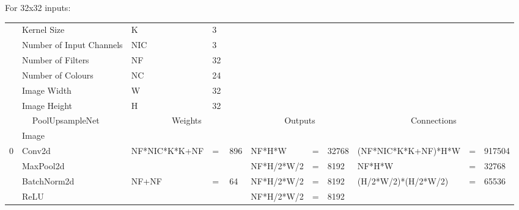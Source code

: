\documentclass{article}
\begin{document}

For 32x32 inputs:

\begin{tiny}
\setlength\tabcolsep{1.5pt}
\begin{tabular}{@{}lllllllllll@{}}
\toprule
      & Kernel Size                 & K                    & 3  &       &                &   &        &                                &   &          \\ 
      & Number of Input Channels    & NIC                  & 3  &       &                &   &        &                                &   &          \\
      & Number of Filters           & NF                   & 32 &       &                &   &        &                                &   &          \\
      & Number of Colours           & NC                   & 24 &       &                &   &        &                                &   &          \\
      & Image Width                 & W                    & 32 &       &                &   &        &                                &   &          \\
      & Image Height                & H                    & 32 &       &                &   &        &                                &   &          \\ \midrule
\multicolumn{2}{c}{PoolUpsampleNet} & \multicolumn{3}{c}{Weights}       & \multicolumn{3}{c}{Outputs} & \multicolumn{3}{c}{Connections}               \\ \midrule
      & Image                       &                      &    &       &                &   &        &                                &   &          \\
0     & Conv2d                      & NF*NIC*K*K+NF        & =  & 896   & NF*H*W         & = & 32768  & (NF*NIC*K*K+NF)*H*W            & = & 917504   \\
      & MaxPool2d                   &                      &    &       & NF*H/2*W/2     & = & 8192   & NF*H*W                         & = & 32768    \\
      & BatchNorm2d                 & NF+NF                & =  & 64    & NF*H/2*W/2     & = & 8192   & (H/2*W/2)*(H/2*W/2)            & = & 65536    \\
      & ReLU                        &                      &    &       & NF*H/2*W/2     & = & 8192   &                                &   &          \\

\end{tabular}
\end{tiny}
\end{document}
